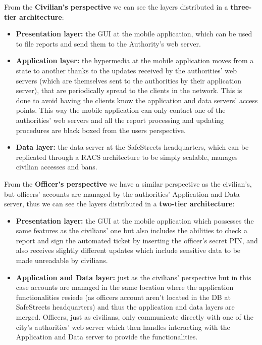 \documentclass[12pt,a4paper]{article}
\begin{document}
From the \textbf{Civilian's perspective} we can see the layers distributed in a \textbf{three-tier architecture}:
\begin{itemize}
\item \textbf{Presentation layer:} the GUI at the mobile application, which can be used to file reports and send them to the Authority's web server. 
\item \textbf{Application layer:} the hypermedia at the mobile application moves from a state to another thanks to the updates received by the authorities' web servers (which are themselves sent to the authorities by their application server), that are periodically spread to the clients in the network. 
This is done to avoid having the clients know the application and data servers' access points. This way the mobile application can only contact one of the authorities' web servers and all the report processing and updating procedures are black boxed from the users perspective.
\item \textbf{Data layer:} the data server at the SafeStreets headquarters, which can be replicated through a RACS architecture to be simply scalable, manages civilian accesses and bans.
\end{itemize}

From the \textbf{Officer's perspective} we have a similar perspective as the civilian's, but officers' accounts are managed by the authorities' Application and Data server, thus we can see the layers distributed in a \textbf{two-tier architecture}:
\begin{itemize}
\item \textbf{Presentation layer:} the GUI at the mobile application which possesses the same features as the civilians' one but also includes the abilities to check a report and sign the automated ticket by inserting the officer's secret PIN, and also receives slightly different updates which
include sensitive data to be made unreadable by civilians. 
\item \textbf{Application and Data layer:} just as the civilians' perspective but in this case accounts are managed in the same location where the application functionalities resiede (as officers account aren't located in the DB at SafeStreets headquarters) and thus the application and data layers are merged.
Officers, just as civilians, only communicate directly with one of the city's authorities' web server which then handles interacting with the Application and Data server to provide the functionalities.
\end{itemize}
\end{document}
